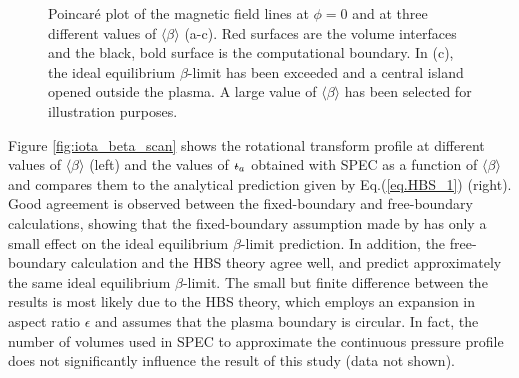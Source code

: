 \documentclass[my_thesis.tex]{subfiles}
\begin{document}
\begin{figure}
	\centering
	\hfill
	\hfill
	\hfill
	\hfill
	\caption{Poincar\'e plot of the magnetic field lines at $\phi=0$ and at three different values of $\langle\beta\rangle$ (a-c). Red surfaces are the volume interfaces and the black, bold surface is the computational boundary. In (c), the ideal equilibrium $\beta$-limit has been exceeded and a central island opened outside the plasma. A large value of $\langle\beta\rangle$ has been selected for illustration purposes.}
	\label{fig:poincare}
\end{figure}

Figure \ref{fig:iota_beta_scan} shows the rotational transform profile at different values of $\langle\beta\rangle$ (left) and the values of $\text{$\iota\!\!$-}_a$ obtained with \ac{SPEC} as a function of $\langle\beta\rangle$ and compares them to the analytical prediction given by Eq.(\ref{eq.HBS_1}) (right). Good agreement is observed between the fixed-boundary and free-boundary calculations, showing that the fixed-boundary assumption made by \citet{Loizu2017} has only a small effect on the ideal equilibrium $\beta$-limit prediction. In addition, the free-boundary calculation and the \ac{HBS} theory agree well, and predict approximately the same ideal equilibrium $\beta$-limit. The small but finite difference between the results is most likely due to the \ac{HBS} theory, which employs an expansion in aspect ratio $\epsilon$ and assumes that the plasma boundary is circular. In fact, the number of volumes used in \ac{SPEC} to approximate the continuous pressure profile does not significantly influence the result of this study (data not shown).
\end{document}

